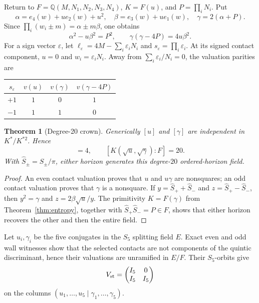 \documentclass[11pt]{article}
\newtheorem{theorem}{Theorem}[section]
\theoremstyle{definition}
\theoremstyle{remark}
\newcommand{\Q}{\mathbb{Q}}
\begin{document}
Return to $F=\Q(M,N_1,N_2,N_3,N_4)$, $K=F(u)$, and $P=\prod_iN_i$.  Put
\begin{equation}
\alpha=e_4(w)+u e_2(w)+u^2,\quad
\beta=e_3(w)+u e_1(w),\quad
\gamma=2(\alpha+P).
\label{eq:alphabetagamma}
\end{equation}
Since $\prod_i(w_i\pm m)=\alpha\pm m\beta$, one obtains
\begin{equation}
\alpha^2-u\beta^2=P^2,\qquad
\gamma(\gamma-4P)=4u\beta^2.
\label{eq:crownidentity}
\end{equation}
For a sign vector $\varepsilon$, let
$\ell_\varepsilon=4M-\sum_i\varepsilon_iN_i$ and
$s_\varepsilon=\prod_i\varepsilon_i$.  At its signed contact component,
$u=0$ and $w_i=\varepsilon_iN_i$.  Away from
$\sum_i\varepsilon_i/N_i=0$, the valuation parities are
\begin{center}
\begin{tabular}{@{}c@{\qquad}ccc@{}}
\toprule
$s_\varepsilon$ & $v(u)$ & $v(\gamma)$ & $v(\gamma-4P)$\\
\midrule
$+1$ & $1$ & $0$ & $1$\\
$-1$ & $1$ & $1$ & $0$\\
\bottomrule
\end{tabular}
\end{center}

\begin{theorem}[Degree-20 crown]
\label{thm:crown20}
Generically $[u]$ and $[\gamma]$ are independent in $K^*/K^{*2}$. Hence
\begin{equation}
[K(\sqrt u,\sqrt\gamma):K]=4,\qquad
[K(\sqrt u,\sqrt\gamma):F]=20.
\end{equation}
With $\widehat S_\pm=S_\pm/\pi$, either horizon generates this degree-$20$
ordered-horizon field.
\end{theorem}

\begin{proof}
An even contact valuation proves that $u$ and $u\gamma$ are nonsquares; an
odd contact valuation proves that $\gamma$ is a nonsquare.  If
$y=\widehat S_++\widehat S_-$ and $z=\widehat S_+-\widehat S_-$, then
$y^2=\gamma$ and $z=2\beta\sqrt u/y$.  The primitivity $K=F(\gamma)$ from
Theorem~\ref{thm:entropy}, together with
$\widehat S_+\widehat S_-=P\in F$, shows that either horizon recovers the
other and then the entire field.
\end{proof}

Let $u_i,\gamma_i$ be the five conjugates in the $S_5$ splitting field $E$.
Exact even and odd wall witnesses show that the selected contacts are not
components of the quintic discriminant, hence their valuations are
unramified in $E/F$.  Their $S_5$-orbits give
\begin{equation}
V_{\rm st}=\begin{pmatrix}I_5&0\\ I_5&I_5\end{pmatrix}
\label{eq:staticmatrix}
\end{equation}
on the columns $(u_1,\ldots,u_5\mid\gamma_1,\ldots,\gamma_5)$.
\end{document}
